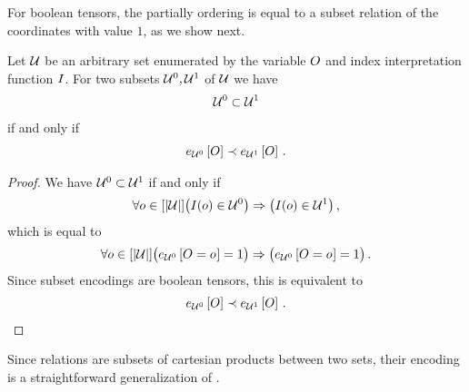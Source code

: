 For boolean tensors, the partially ordering is equal to a subset relation of the coordinates with value $1$, as we show next.

\begin{theorem}
    \label{the:subsetRelationSubsetEncoding}
    Let $\mathcal{U}$ be an arbitrary set enumerated by the variable $O$ and index interpretation function $I$.
    For two subsets $\mathcal{U}^{0},\mathcal{U}^{1}$ of $\mathcal{U}$ we have
    \begin{align*}
        \mathcal{U}^{0} \subset \mathcal{U}^{1}
    \end{align*}
    if and only if
    \begin{align*}
        e_{\mathcal{U}^{0}}\left[O\right] \prec e_{\mathcal{U}^{1}}\left[O\right] \, .
    \end{align*}
\end{theorem}
\begin{proof}
    We have $\mathcal{U}^{0} \subset \mathcal{U}^{1}$ if and only if
    \begin{align*}
        \forall{o\in[\left|\mathcal{U}\right|]} \big(I(o)\in\mathcal{U}^{0}\big) \Rightarrow \big(I(o)\in\mathcal{U}^{1}\big) \, ,
    \end{align*}
    which is equal to
    \begin{align*}
        \forall{o\in[\left|\mathcal{U}\right|]} \big(e_{\mathcal{U}^{0}}\left[O_{}=o_{}\right]=1\big) \Rightarrow \big(e_{\mathcal{U}^{0}}\left[O_{}=o_{}\right]=1\big)  \, .
    \end{align*}
    Since subset encodings are boolean tensors, this is equivalent to
    \begin{align*}
        e_{\mathcal{U}^{0}}\left[O\right] \prec e_{\mathcal{U}^{1}}\left[O\right] \, .
    \end{align*}
\end{proof}



Since relations are subsets of cartesian products between two sets, their encoding is a straightforward generalization of .

